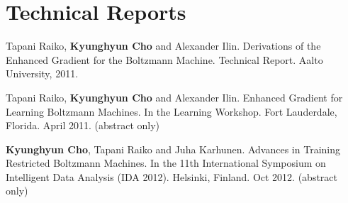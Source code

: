 \documentclass[11pt, oneside]{essay}
\begin{document}
\section{Technical Reports}

Tapani Raiko, \textbf{Kyunghyun Cho} and Alexander Ilin.
Derivations of the Enhanced Gradient for the Boltzmann
Machine.  Technical Report. Aalto University, 2011.

Tapani Raiko, \textbf{Kyunghyun Cho} and Alexander Ilin.
Enhanced Gradient for Learning Boltzmann Machines.
In the Learning Workshop. Fort Lauderdale, Florida. April
2011. (abstract only)

\textbf{Kyunghyun Cho}, Tapani Raiko and Juha Karhunen.
Advances in Training Restricted Boltzmann Machines.
In the 11th International Symposium on Intelligent Data
Analysis (IDA 2012). Helsinki, Finland. Oct 2012. (abstract
only)
\end{document}

